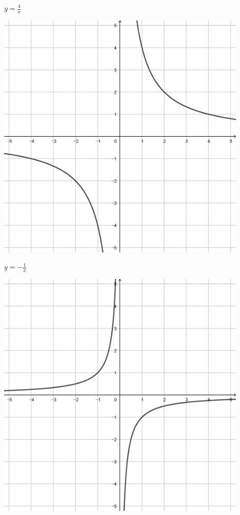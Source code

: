 \documentclass[a4paper]{oblivoir}
\begin{document}
\begin{minipage}{0.45\textwidth}\centering
\(y=\frac4x\)
\par\bigskip\includegraphics[width=0.9\textwidth]{img/18-3}
\end{minipage}
\begin{minipage}{0.45\textwidth}\centering
\(y=-\frac1{x}\)
\par\bigskip\includegraphics[width=0.9\textwidth]{img/18-4}
\end{minipage}\bigskip\bigskip\par
\end{document}
